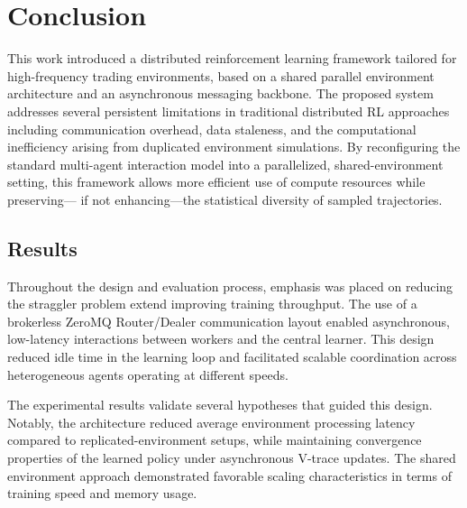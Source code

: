 \chapter{Conclusion}
\label{ch:conclusion}

This work introduced a distributed reinforcement learning framework tailored for high-frequency trading environments,
based on a shared parallel environment architecture and an asynchronous messaging backbone.
The proposed system addresses several persistent limitations in traditional distributed RL approaches
including communication overhead, data staleness, and the computational inefficiency arising from duplicated environment simulations.
By reconfiguring the standard multi-agent interaction model into a parallelized,
shared-environment setting, this framework allows more efficient use of compute resources while preserving---
if not enhancing---the statistical diversity of sampled trajectories.

\section{Results}
\label{sec:results}

Throughout the design and evaluation process, emphasis was placed on reducing the straggler problem extend improving training throughput.
The use of a brokerless ZeroMQ Router/Dealer communication layout enabled asynchronous, low-latency interactions between workers and the central learner.
This design reduced idle time in the learning loop and facilitated scalable coordination across heterogeneous agents operating at different speeds.

The experimental results validate several hypotheses that guided this design.
Notably, the architecture reduced average environment processing latency compared to replicated-environment setups,
while maintaining convergence properties of the learned policy under asynchronous V-trace updates.
The shared environment approach demonstrated favorable scaling characteristics in terms of training speed and memory usage.

